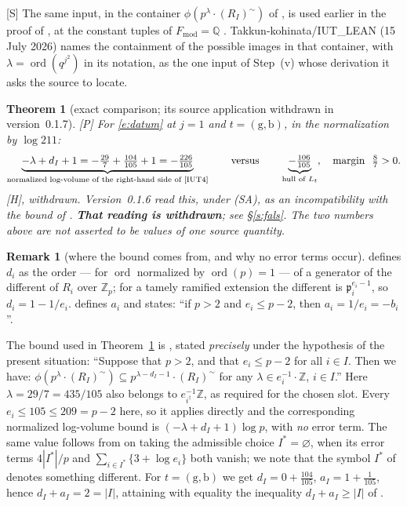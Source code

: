 \documentclass[11pt]{article}
\theoremstyle{plain}
\newtheorem{theorem}{Theorem}
\theoremstyle{definition}
\newtheorem{remark}{Remark}
\newcommand{\Fmod}{F_{\mathrm{mod}}}
\newcommand{\SA}{\textup{(SA)}}
\newcommand{\ord}{\operatorname{ord}}
\begin{document}
\textup{[S]} The same input, in the container $\phi(p^{\lambda}\cdot(R_I)^{\sim})$
of \cite[Prop.~1.2]{IUT4}, is used earlier in the proof of \cite[Prop.~1.10]{Zhou},
at the constant tuples of $\Fmod=\mathbb{Q}$ \cite[Def.~1.8(i), Lemma~1.4]{Zhou}.
Takkun-kohinata/IUT\_LEAN \cite{TK} (15 July 2026) names the containment of the
possible images in that container, with $\lambda=\ord(q^{j^2})$ in its notation, as
the one input of Step~(v) whose derivation it asks the source to locate.

\begin{theorem}[exact comparison; its source application withdrawn in
version~0.1.7]\label{t:cmp}
\textup{[P]} For \eqref{e:datum} at $j=1$ and $t=(\mathrm{g},\mathrm{b})$, in
the normalization by $\log211$:
\[
 \underbrace{-\lambda+d_I+1=-\tfrac{29}{7}+\tfrac{104}{105}+1=-\tfrac{226}{105}}
   _{\text{normalized log-volume of the right-hand side of \cite[Prop.~1.2(iii)]{IUT4}}}
 \qquad\text{versus}\qquad
 \underbrace{-\tfrac{106}{105}}_{\text{hull of }L_t},
 \quad\text{margin }\ \tfrac{8}{7}>0 .
\]
\textup{[H], withdrawn.}  Version~0.1.6 read this, under \SA{}, as an
incompatibility with the bound of \cite[Thm.~1.10, proof, Step~(v)]{IUT4}.
\textbf{That reading is withdrawn}; see \S\ref{s:fals}.  The two numbers above
are not asserted to be values of one source quantity.
\end{theorem}

\begin{remark}[where the bound comes from, and why no error terms occur]
\label{r:tame}
\cite[Prop.~1.1]{IUT4} defines $d_i$ as the order --- for $\ord$ normalized by
$\ord(p)=1$ --- of a generator of the different of $R_i$ over $\mathbb{Z}_p$; for a
tamely ramified extension the different is $\mathfrak{p}_i^{e_i-1}$, so
$d_i=1-1/e_i$.  \cite[Prop.~1.2]{IUT4} defines $a_i$ and states: ``if $p>2$ and
$e_i\le p-2$, then $a_i=1/e_i=-b_i$''.

The bound used in Theorem~\ref{t:cmp} is \cite[Prop.~1.2(iii)]{IUT4}, stated
\emph{precisely} under the hypothesis of the present situation: ``Suppose that
$p>2$, and that $e_i\le p-2$ for all $i\in I$.  Then we have:
$\phi(p^\lambda\cdot(R_I)^{\sim})\subseteq p^{\lambda-d_I-1}\cdot(R_I)^{\sim}$
for any $\lambda\in e_i^{-1}\cdot\mathbb Z$, $i\in I$.''
Here $\lambda=29/7=435/105$ also belongs to
$e_{i^\dagger}^{-1}\mathbb Z$, as required for the chosen slot.
Every $e_i\le105\le209=p-2$ here, so it applies directly and the corresponding
normalized log-volume bound is $(-\lambda+d_I+1)\log p$, with \emph{no} error
term.  The same value follows from \cite[Prop.~1.4(iii)]{IUT4} on taking the
admissible choice $I^*=\varnothing$, when its error terms $4|I^*|/p$ and
$\sum_{i\in I^*}\{3+\log e_i\}$ both vanish; we note that the symbol $I^*$ of
\cite[Prop.~1.1]{IUT4} denotes something different.  For
$t=(\mathrm{g},\mathrm{b})$ we get $d_I=0+\tfrac{104}{105}$,
$a_I=1+\tfrac1{105}$, hence $d_I+a_I=2=|I|$, attaining with equality the
inequality $d_I+a_I\ge|I|$ of \cite[Prop.~1.4(iii)]{IUT4}.
\end{remark}
\end{document}

